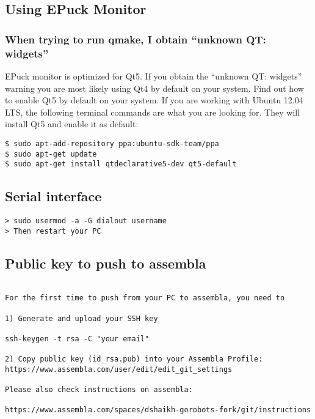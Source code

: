 \subsection{Using EPuck Monitor}

\subsubsection{When trying to run qmake, I obtain ``unknown QT: widgets''}
EPuck monitor is optimized for Qt5. If you obtain the ``unknown QT: widgets'' warning you are most likely using Qt4 by default on your system. Find out how to enable Qt5 by default on your system. If you are working with Ubuntu 12.04 LTS, the following terminal commands are what you are looking for. They will install Qt5 and enable it as default:
\begin{lstlisting}
$ sudo apt-add-repository ppa:ubuntu-sdk-team/ppa
$ sudo apt-get update
$ sudo apt-get install qtdeclarative5-dev qt5-default
\end{lstlisting}


\subsection{Serial interface}
\begin{lstlisting}
> sudo usermod -a -G dialout username
> Then restart your PC

\end{lstlisting}

\subsection{Public key to push to assembla}
\begin{lstlisting}

For the first time to push from your PC to assembla, you need to

1) Generate and upload your SSH key

ssh-keygen -t rsa -C "your email"

2) Copy public key (id_rsa.pub) into your Assembla Profile:
https://www.assembla.com/user/edit/edit_git_settings

Please also check instructions on assembla:

https://www.assembla.com/spaces/dshaikh-gorobots-fork/git/instructions

\end{lstlisting}


